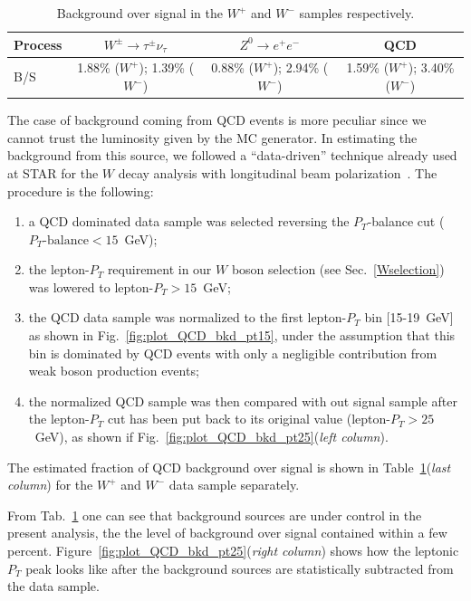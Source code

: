 \documentclass[12pt]{article}
\begin{document}
\begin{table}[htbp]
\centering
\begin{tabular}{| l | c | c  |  c |}
\hline
Process & $W^{\pm}\rightarrow \tau^{\pm} \nu_{\tau}$ & $Z^{0} \rightarrow e^{+}e^{-}$ & QCD \\
\hline
B/S & 1.88\% ($W^{+}$); 1.39\% ($W^{-}$)&  0.88\% ($W^{+}$); 2.94\% ($W^{-}$)& 1.59\% ($W^{+}$); 3.40\% ($W^{-}$)\\
\hline
\end{tabular}
\caption{Background over signal in the $W^{+}$ and $W^{-}$ samples respectively.}
\label{Tab:BoS}
\end{table}

The case of background coming from QCD events is more peculiar since we cannot trust the luminosity given by the MC generator. In estimating the background from this source, we followed a ``data-driven'' technique already used at STAR for the $W$ decay analysis with longitudinal beam polarization~\cite{STAR_W_AL_2012-paper, STAR_W_AL_2012-note}. The procedure is the following:

\begin{enumerate}
   \item a QCD dominated data sample was selected reversing the $P_{T}$-balance cut ($P_{T}\text{-balance} < 15$~GeV);
   \item the lepton-$P_{T}$ requirement in our $W$ boson selection (see Sec.~\ref{Wselection}) was lowered to  lepton-$P_{T} > 15$~GeV;
   \item the QCD data sample was normalized to the first lepton-$P_{T}$ bin [15-19~GeV] as shown in Fig.~\ref{fig:plot_QCD_bkd_pt15}, under the assumption that this bin is dominated by QCD events with only a negligible contribution from weak boson production events;
   \item the normalized QCD sample was then compared with out signal sample after the lepton-$P_{T}$ cut has been put back to its original value (lepton-$P_{T} > 25$~GeV), as shown if Fig.~\ref{fig:plot_QCD_bkd_pt25}({\it left column}). 
\end{enumerate}


The estimated fraction of QCD background over signal is shown in Table~\ref{Tab:BoS}({\it last column}) for the $W^{+}$ and $W^{-}$ data sample separately. 

From Tab.~\ref{Tab:BoS} one can see that background sources are under control in the present analysis, the the level of background over signal contained within a few percent. Figure~\ref{fig:plot_QCD_bkd_pt25}({\it right column}) shows how the leptonic $P_{T}$ peak looks like after the background sources are statistically subtracted from the data sample.
\end{document}
